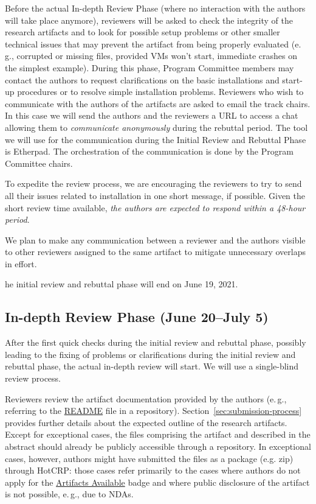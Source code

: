 \documentclass[twoside,a4paper]{refart}
\newcommand{\eg}{e.\,g.,\xspace}
\newcommand{\available}{\protect\hyperlink{available}{Artifacts Available}\xspace}
\newcommand{\deadline}[1]{\attention[\faCalendar]{#1}}
\begin{document}
Before the actual In-depth Review Phase (where no interaction with the
authors will take place anymore), reviewers will be asked to check the
integrity of the research artifacts and to look for possible setup
problems or other smaller technical issues that may prevent the
artifact from being properly evaluated (\eg corrupted or missing
files, provided VMs won’t start, immediate crashes on the simplest
example). During this phase, Program Committee members may contact the
authors to request clarifications on the basic installations and
start-up procedures or to resolve simple installation problems.
Reviewers who wish to communicate with the authors of the artifacts
are asked to email the track chairs. In this case we will send the
authors and the reviewers a URL to access a chat allowing them to
\emph{communicate anonymously} during the rebuttal period. The tool we
will use for the communication during the Initial Review and Rebuttal
Phase is Etherpad. The orchestration of the communication is done by
the Program Committee chairs.

To expedite the review process, we are encouraging the reviewers to
try to send all their issues related to installation in one short
message, if possible. Given the short review time available,\emph{ the
  authors are expected to respond within a 48-hour period}.

We plan to make any communication between a reviewer and the authors
visible to other reviewers assigned to the same artifact to mitigate
unnecessary overlaps in effort.

\deadline The initial review and rebuttal phase will end on June 19,
2021.

\subsection{In-depth Review Phase (June 20--July 5)}

After the first quick checks during the initial review and rebuttal
phase, possibly leading to the fixing of problems or clarifications
during the initial review and rebuttal phase, the actual in-depth
review will start. We will use a single-blind review process.
 
Reviewers review the artifact documentation provided by the authors
(\eg referring to the \hyperlink{readme}{README} file in a
repository). 
Section~\ref{sec:submission-process} provides further details about
the expected outline of the research artifacts. Except for exceptional
cases, the files comprising the artifact and described in the abstract
should already be publicly accessible through a repository. In
exceptional cases, however, authors might have submitted the files as
a package (e.g. zip) through HotCRP: those cases refer primarily to
the cases where authors do not apply for the \available badge and
where public disclosure of the artifact is not possible, \eg due to
NDAs.
\end{document}
